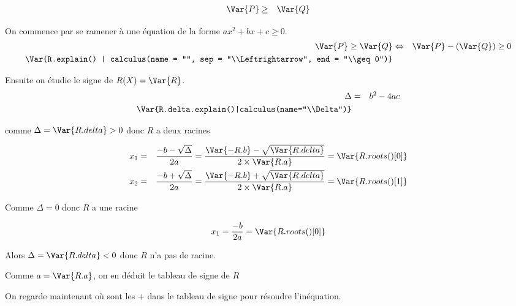 \documentclass[a4paper,10pt, table]{/media/documents/Cours/Prof/Enseignements/tools/style/classDS}
\begin{document}
\begin{questions}
        \begin{eqnarray*}
            \Var{P} & \geq & \Var{Q} 
        \end{eqnarray*}


        \begin{solution}
            On commence par se ramener à une équation de la forme $ax^2 + bx + c \geq 0$.
        \begin{eqnarray*}
            \Var{P} \geq \Var{Q} & \Leftrightarrow & \Var{P} - (\Var{Q}) \geq 0 \\
            \Var{R.explain() | calculus(name = "", sep = "\\Leftrightarrow", end = "\\geq 0")}
        \end{eqnarray*}


        Ensuite on étudie le signe de $R(X) = \Var{R}$.
        \begin{eqnarray*}
            \Delta & = & b^2-4ac \\
            \Var{R.delta.explain()|calculus(name="\\Delta")}
        \end{eqnarray*}

            comme $\Delta = \Var{R.delta} > 0$ donc $R$ a deux racines

            \begin{eqnarray*}
                x_1 & = & \frac{-b - \sqrt{\Delta}}{2a} =  \frac{\Var{-R.b} - \sqrt{\Var{R.delta}}}{2 \times \Var{R.a}} = \Var{R.roots()[0] } \\
                x_2 & = & \frac{-b + \sqrt{\Delta}}{2a} =  \frac{\Var{-R.b} + \sqrt{\Var{R.delta}}}{2 \times \Var{R.a}} = \Var{R.roots()[1] }
            \end{eqnarray*}


            Comme $\Delta = 0$ donc $R$ a une racine

            \begin{eqnarray*}
                x_1 = \frac{-b}{2a} = \Var{R.roots()[0]} \\
            \end{eqnarray*}


            Alors $\Delta = \Var{R.delta} < 0$ donc $R$ n'a pas de racine.

        Comme $a = \Var{R.a}$, on en déduit le tableau de signe de $R$
            \begin{center}
            \end{center}
        On regarde maintenant où sont les $+$ dans le tableau de signe pour résoudre l'inéquation.
            


\end{solution}
\end{questions}
\end{document}
